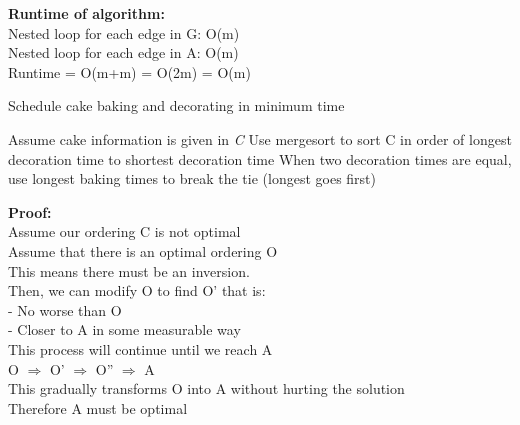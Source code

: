 \documentclass[12pt]{article}
\begin{document}
\noindent \textbf{Runtime of algorithm:} \\
Nested loop for each edge in G: O(m)\\
Nested loop for each edge in A: O(m)\\
Runtime = O(m+m) = O(2m) = O(m)

\pagebreak

\begin{algorithm}[H]
\caption{Schedule cake baking and decorating in minimum time}
\begin{algorithmic}
\State Assume cake information is given in \textit{C}
\State Use mergesort to sort C in order of longest decoration time to shortest decoration time
\State When two decoration times are equal, use longest baking times to break the tie (longest goes first)
\end{algorithmic}
\end{algorithm}

\noindent \textbf{Proof:}\\
Assume our ordering C is not optimal\\
Assume that there is an optimal ordering O\\
This means there must be an inversion.\\
Then, we can modify O to find O' that is:\\
- No worse than O\\
- Closer to A in some measurable way\\

\noindent This process will continue until we reach A\\
O $\Rightarrow$ O' $\Rightarrow$ O'' $\Rightarrow$ A\\
This gradually transforms O into A without hurting the solution\\
Therefore A must be optimal


\end{document}
